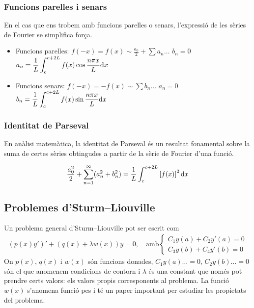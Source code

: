 \subsubsection*{Funcions parelles i senars}
En el cas que ens trobem amb funcions parelles o senars, l'expressió de les sèries de Fourier se simplifica força.
\begin{itemize}
    \item Funcions parelles: $f(-x) = f(x) \sim \frac{a_{0}}{2} + \sum a_{n} \dots$
        \subitem $\displaystyle b_{n} = 0 $
        \subitem $\displaystyle a_{n} = \frac{1}{L} \int_{c}^{c+2L} f(x) \cos \frac{n \pi x}{L} \mathrm{d} x $
    \item Funcions senars: $f(-x) = -f(x) \sim \sum b_{n} \dots$
        \subitem $\displaystyle a_{n} = 0$
        \subitem $\displaystyle b_{n} = \frac{1}{L} \int_{c}^{c+2L} f(x) \sin \frac{n \pi x}{L} \mathrm{d} x $
\end{itemize}

\subsubsection*{Identitat de Parseval}
En anàlisi matemàtica, la identitat de Parseval és un resultat fonamental sobre la suma de certes sèries obtingudes a partir de la sèrie de Fourier d'una funció.
\begin{defi}
    \begin{align}
        \frac{a_{0}^{2}}{2} + \sum_{n=1}^{\infty} (a_{n}^{2} + b_{n}^{2} ) = \frac{1}{L} \int_{c}^{c+2L} \left[ f(x) \right]^{2} \mathop{}\!\mathrm{d} x
    \end{align}
\end{defi}

\subsection{Problemes d'Sturm--Liouville}
Un problema general d'Sturm--Liouville pot ser escrit com
\begin{align}\label{eq:S-L}
    (p(x)y')' + (q(x) + \lambda w(x)) y = 0, \quad \text{amb} \begin{cases} C_{1} y(a) + C_{2}y'(a) = 0 \\ C_{3}y(b) + C_{4}y'(b) = 0  \end{cases}
\end{align}
On $p(x)$, $q(x)$ i $w(x)$ són funcions donades, $C_{1}y(a) \dots = 0$, $C_{2}y(b) \dots = 0$ són el que anomenem condicions de contorn i $\lambda$ és una constant que només pot prendre certs valors: els valors propis corresponents al problema. La funció $w(x)$ s'anomena funció pes i té un paper important per estudiar les propietats del problema.

